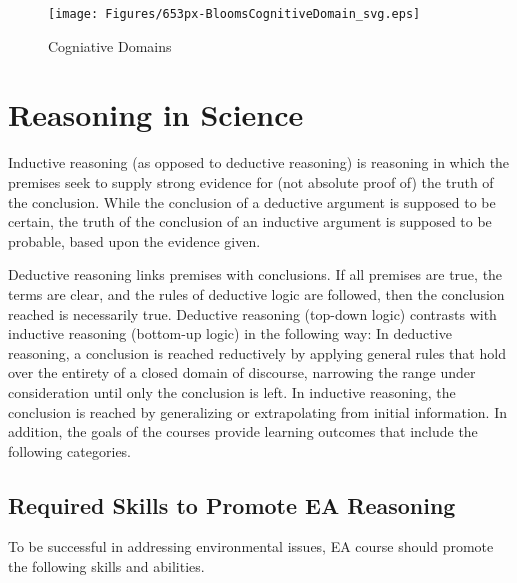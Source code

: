\documentclass{tufte-book}\usepackage[]{graphicx}\usepackage[]{xcolor}
\begin{document}
\begin{figure}
	\centering
		\texttt{[image: Figures/653px-BloomsCognitiveDomain\_svg.eps]}
	\caption{Cogniative Domains}
	\label{fig:CognitiveDomains}
\end{figure}


\section{Reasoning in Science}

Inductive reasoning (as opposed to deductive reasoning) is reasoning in which the premises seek to supply strong evidence for (not absolute proof of) the truth of the conclusion. While the conclusion of a deductive argument is supposed to be certain, the truth of the conclusion of an inductive argument is supposed to be probable, based upon the evidence given.


Deductive reasoning links premises with conclusions. If all premises are true, the terms are clear, and the rules of deductive logic are followed, then the conclusion reached is necessarily true. Deductive reasoning (top-down logic) contrasts with inductive reasoning (bottom-up logic) in the following way: In deductive reasoning, a conclusion is reached reductively by applying general rules that hold over the entirety of a closed domain of discourse, narrowing the range under consideration until only the conclusion is left. In inductive reasoning, the conclusion is reached by generalizing or extrapolating from initial information.
In addition, the goals of the courses provide learning outcomes that include the following categories.

\subsection{Required Skills to Promote EA Reasoning}

To be successful in addressing environmental issues, EA course should promote the following skills and abilities.
\end{document}

